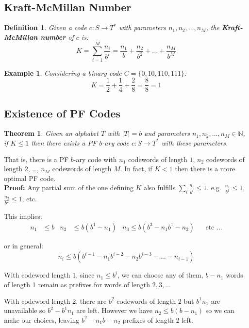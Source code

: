 \documentclass[11pt]{article}
\newtheorem{defn}{Definition}
\newtheorem{eg}{Example}
\newtheorem{theo}{Theorem}
\begin{document}
\subsection{Kraft-McMillan Number}
\begin{defn}
  Given a code $c : S \rightarrow T^*$ with parameters $n_1, n_2, \ldots, n_M$, the \textbf{Kraft-McMillan number} of $c$ is:
  \[ K = \sum_{i = 1}^{M} \frac{n_i}{b^i} = \frac{n_1}{b} + \frac{n_2}{b^2} + \ldots + \frac{n_M}{b^M} \]
\end{defn}

\begin{eg}
  Considering a binary code $C = \{ 0, 10, 110, 111 \}$:
  \[ K = \frac{1}{2} + \frac{1}{4} + \frac{2}{8} = \frac{8}{8} = 1 \]
\end{eg}

\subsection{Existence of PF Codes}
\begin{theo}
  Given an alphabet $T$ with $\lvert T \rvert = b$ and parameters $n_1, n_2, \ldots, n_M \in \mathbb{N}$, if $K \leq 1$ then there exists a PF $b$-ary code $c : S \rightarrow T^*$ with these parameters.
\end{theo}

That is, there is a PF $b$-ary code with $n_1$ codewords of length $1$, $n_2$ codewords of length $2$, \ldots, $n_M$ codewords of length $M$.
In fact, if $K < 1$ then there is a more optimal PF code. \\

\textbf{Proof:}
Any partial sum of the one defining $K$ also fulfills $\sum_{i} \frac{n_i}{b^i} \leq 1$.
e.g.\ $\frac{n_1}{b^1} \leq 1$, $\frac{n_2}{b^2} \leq 1$, etc.

This implies:
\begin{align*}
  n_1 &\leq b & n_2 &\leq b(b^1 - n_1) & n_3 \leq b(b^3 - n_1b^1 - n_2) & &\text{etc \ldots}
\end{align*}

or in general:
\[ n_i \leq b(b^{i - 1} - n_1b^{i - 2} - n_2b^{i - 3} - \ldots - n_{i - 1}) \]

With codeword length $1$, since $n_1 \leq b^i$, we can choose any of them, $b - n_1$ words of length 1 remain as prefixes for words of length $2, 3, \ldots$

With codeword length $2$, there are $b^2$ codewords of length 2 but $b^1n_1$ are unavailable so $b^2 - b^1n_1$ are left.
However we have $n_2 \leq b(b - n_1)$ so we can make our choices, leaving $b^2 - n_1b - n_2$ prefixes of length 2 left.
\end{document}
